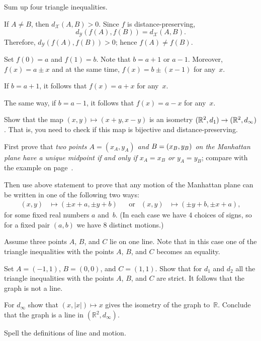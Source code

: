  Sum up four triangle inequalities.

If $A\ne B$, then $d_\mathcal{X}(A,B)>0$.
Since $f$ is distance-preserving,
$$d_\mathcal{Y}(f(A),f(B))=d_\mathcal{X}(A,B).$$
Therefore, $d_\mathcal{Y}(f(A),f(B))>0$; hence $f(A)\ne f(B)$.

Set $f(0)=a$ and $f(1)=b$.
Note that $b=a+1$ or $a-1$.
Moreover, $f(x)=a\pm x$ and at the same time, $f(x)=b\pm(x-1)$ for any~$x$.

If $b=a+1$, 
it follows that 
$f(x)=a+x$ for any~$x$.

The same way, if $b=a-1$, 
it follows that 
$f(x)=a-x$ for any~$x$.

Show that the map $(x,y)\mapsto (x+y,x-y)$ is an isometry  $(\mathbb{R}^2,d_1)\z\to (\mathbb{R}^2,d_\infty)$.
That is, you need to check if this map is bijective and distance-preserving.

First prove that \textit{two points $A=(x_A,y_A)$ and $B\z=(x_B,y_B)$ on the Manhattan plane have a unique midpoint if and only if $x_A=x_B$ or $y_A=y_B$}; compare with the example on page~\pageref{example:isometric but not congruent}. 

Then use above statement to prove that
any motion of the Manhattan plane 
can be written in one of the following two ways:
\begin{align*}
(x,y)&\mapsto (\pm x+a,\pm y+b)
&&\text{or} 
&(x,y)&\mapsto (\pm y+b,\pm x+a),
\end{align*}
for some fixed real numbers $a$ and~$b$.
(In each case we have 4 choices of signs, so for a fixed pair $(a,b)$ we have 8 distinct motions.)

Assume three points $A$, $B$, and $C$ lie on one line.
Note that in this case one of the triangle inequalities with the points $A$, $B$, and $C$ becomes an equality.

Set $A=(-1,1)$, $B=(0,0)$, and $C=(1,1)$.
Show that for $d_1$ and $d_2$
all the triangle inequalities with the points $A$, $B$, and $C$ are strict.
It follows that the graph is not a line.

For $d_\infty$ show that $(x,|x|)\mapsto x$ gives the isometry of the graph to~$\mathbb{R}$.
Conclude that the graph is a line in $(\mathbb{R}^2,d_\infty)$.

Spell the definitions of line and motion.

